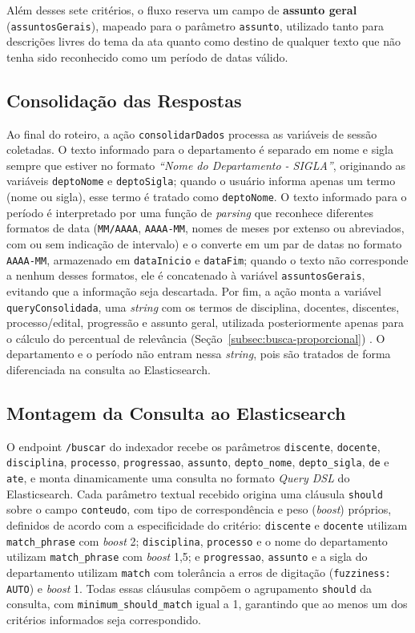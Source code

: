 Além desses sete critérios, o fluxo reserva um campo de \textbf{assunto geral} (\texttt{assuntosGerais}), mapeado para o parâmetro \texttt{assunto}, utilizado tanto para descrições livres do tema da ata quanto como destino de qualquer texto que não tenha sido reconhecido como um período de datas válido.

\subsection{Consolidação das Respostas}

Ao final do roteiro, a ação \texttt{consolidarDados} processa as variáveis de sessão coletadas. O texto informado para o departamento é separado em nome e sigla sempre que estiver no formato \textit{``Nome do Departamento - SIGLA''}, originando as variáveis \texttt{deptoNome} e \texttt{deptoSigla}; quando o usuário informa apenas um termo (nome ou sigla), esse termo é tratado como \texttt{deptoNome}. O texto informado para o período é interpretado por uma função de \textit{parsing} que reconhece diferentes formatos de data (\texttt{MM/AAAA}, \texttt{AAAA-MM}, nomes de meses por extenso ou abreviados, com ou sem indicação de intervalo) e o converte em um par de datas no formato \texttt{AAAA-MM}, armazenado em \texttt{dataInicio} e \texttt{dataFim}; quando o texto não corresponde a nenhum desses formatos, ele é concatenado à variável \texttt{assuntosGerais}, evitando que a informação seja descartada. Por fim, a ação monta a variável \texttt{queryConsolidada}, uma \textit{string} com os termos de disciplina, docentes, discentes, processo/edital, progressão e assunto geral, utilizada posteriormente apenas para o cálculo do percentual de relevância (Seção~\ref{subsec:busca-proporcional}) . O departamento e o período não entram nessa \textit{string}, pois são tratados de forma diferenciada na consulta ao Elasticsearch.

\subsection{Montagem da Consulta ao Elasticsearch}

O endpoint \texttt{/buscar} do indexador recebe os parâmetros \texttt{discente}, \texttt{docente}, \texttt{disciplina}, \texttt{processo}, \texttt{progressao}, \texttt{assunto}, \texttt{depto\_nome}, \texttt{depto\_sigla}, \texttt{de} e \texttt{ate}, e monta dinamicamente uma consulta no formato \textit{Query DSL} do Elasticsearch. Cada parâmetro textual recebido origina uma cláusula \texttt{should} sobre o campo \texttt{conteudo}, com tipo de correspondência e peso (\textit{boost}) próprios, definidos de acordo com a especificidade do critério: \texttt{discente} e \texttt{docente} utilizam \texttt{match\_phrase} com \textit{boost} 2; \texttt{disciplina}, \texttt{processo} e o nome do departamento utilizam \texttt{match\_phrase} com \textit{boost} 1,5; e \texttt{progressao}, \texttt{assunto} e a sigla do departamento utilizam \texttt{match} com tolerância a erros de digitação (\texttt{fuzziness: AUTO}) e \textit{boost} 1. Todas essas cláusulas compõem o agrupamento \texttt{should} da consulta, com \texttt{minimum\_should\_match} igual a 1, garantindo que ao menos um dos critérios informados seja correspondido.


